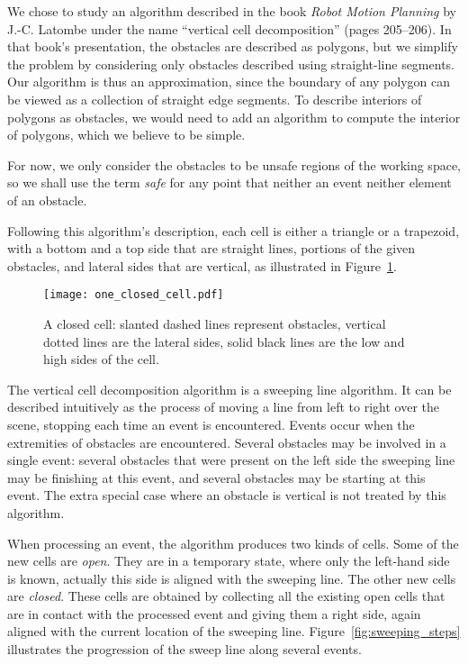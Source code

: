 \documentclass[a4paper, USenglish, cleveref, autoref, thm-restate, final]{lipics-v2021}
\begin{document}
We chose to study an algorithm described in the book {\em Robot Motion
 Planning} by J.-C. Latombe under the name ``vertical cell
decomposition'' \cite{Latombe91} (pages 205--206).  In that book's
presentation, the obstacles are
described as polygons, but we simplify the problem by
considering only obstacles described using straight-line segments.
Our algorithm is thus an approximation, since the boundary of
any polygon can be viewed as a collection of straight edge segments.
To describe interiors of polygons as obstacles, we would need to add an
algorithm to compute the interior of polygons, which we believe to be
simple.

For now, we only consider the obstacles to be unsafe regions of the
working space, so we shall use the term {\em safe} for any point that
neither an event neither element of an obstacle.

Following this algorithm's description, each cell is either a
triangle or a trapezoid, with a bottom and a top side that are
straight lines, portions of the given obstacles, and lateral sides
that are vertical, as illustrated in Figure~\ref{fig:closed_cell}.
\begin{figure}[h]
\texttt{[image: one\_closed\_cell.pdf]}
\caption{A closed cell: slanted dashed lines represent obstacles,
  vertical dotted lines are the lateral sides, solid black lines are
  the low and high sides of the cell.}
\label{fig:closed_cell}
\end{figure}

The vertical cell decomposition algorithm is a sweeping line
algorithm. It can be described
intuitively as the process of moving a line from left to right over
the scene, stopping each time an event is encountered.
Events occur when the extremities of obstacles are encountered.
Several obstacles may be involved in a single event: several
obstacles that were present on the left side the sweeping line may be
finishing at this event, and several obstacles may be starting at this
event.  The extra special case where an obstacle is vertical is not
treated by this algorithm.

When processing an event, the algorithm produces two kinds of cells.
Some of the new cells are {\em open}.  They are in a temporary state,
where only the left-hand side is known, actually this side is aligned
with the sweeping line.  The other new cells are {\em closed}.  These
cells are obtained by collecting all the existing open cells that are in contact
with the processed event and giving them a right side, again aligned with
the current location of the sweeping line.
Figure~\ref{fig:sweeping_steps} illustrates the progression of the
sweep line along several events.
\end{document}
